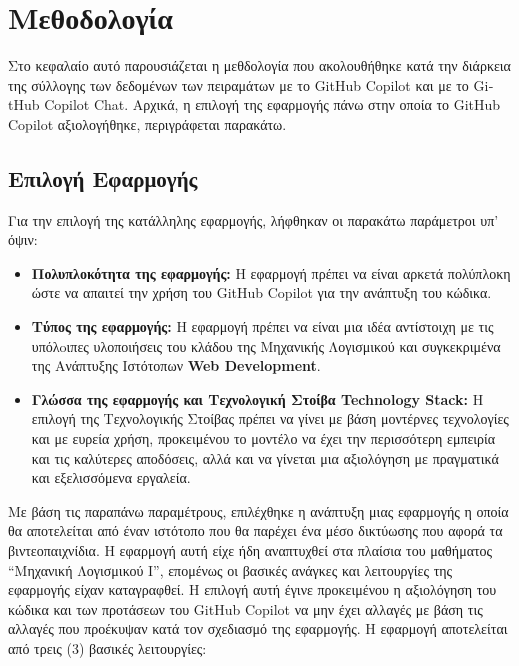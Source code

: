 \chapter{Μεθοδολογία}
\label{ch:chapter3}

Στο κεφαλαίο αυτό παρουσιάζεται η μεθδολογία που ακολουθήθηκε κατά την διάρκεια της σύλλογης των δεδομένων των πειραμάτων με το \textlatin{GitHub Copilot} και με το \textlatin{GitHub Copilot Chat}. Αρχικά, η επιλογή της εφαρμογής πάνω στην οποία το \textlatin{GitHub Copilot} αξιολογήθηκε, περιγράφεται παρακάτω.

\section{Επιλογή Εφαρμογής}
\label{sec:app_selection}

Για την επιλογή της κατάλληλης εφαρμογής, λήφθηκαν οι παρακάτω παράμετροι υπ' όψιν:

\begin{itemize}
    \item \textbf{Πολυπλοκότητα της εφαρμογής:} Η εφαρμογή πρέπει να είναι αρκετά πολύπλοκη ώστε να απαιτεί την χρήση του \textlatin{GitHub Copilot} για την ανάπτυξη του κώδικα.
    \item \textbf{Τύπος της εφαρμογής:} Η εφαρμογή πρέπει να είναι μια ιδέα αντίστοιχη με τις υπόλoιπες υλοποιήσεις του κλάδου της Μηχανικής Λογισμικού και συγκεκριμένα της Ανάπτυξης Ιστότοπων \textlatin{\textbf{Web Development}}.
    \item \textbf{Γλώσσα της εφαρμογής και Τεχνολογική Στοίβα \textlatin{Technology Stack}:} Η επιλογή της Τεχνολογικής Στοίβας πρέπει να γίνει με βάση μοντέρνες τεχνολογίες και με ευρεία χρήση, προκειμένου το μοντέλο να έχει την περισσότερη εμπειρία και τις καλύτερες αποδόσεις, αλλά και να γίνεται μια αξιολόγηση με πραγματικά και εξελισσόμενα εργαλεία.
\end{itemize}

Με βάση τις παραπάνω παραμέτρους, επιλέχθηκε η ανάπτυξη μιας εφαρμογής η οποία θα αποτελείται από έναν ιστότοπο που θα παρέχει ένα μέσο δικτύωσης που αφορά τα βιντεοπαιχνίδια. Η εφαρμογή αυτή είχε ήδη αναπτυχθεί στα πλαίσια του μαθήματος ``Μηχανική Λογισμικού Ι'', επομένως οι βασικές ανάγκες και λειτουργίες της εφαρμογής είχαν καταγραφθεί. Η επιλογή αυτή έγινε προκειμένου η αξιολόγηση του κώδικα και των προτάσεων του \textlatin{GitHub Copilot} να μην έχει αλλαγές με βάση τις αλλαγές που προέκυψαν κατά τον σχεδιασμό της εφαρμογής. Η εφαρμογή αποτελείται από τρεις (3) βασικές λειτουργίες:


